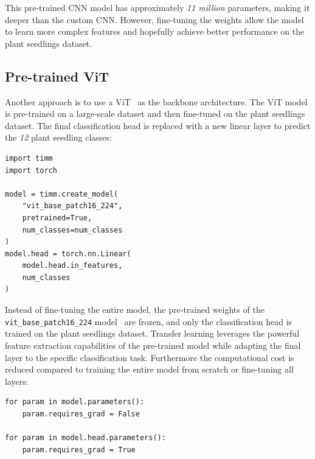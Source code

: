 This pre-trained CNN model has approximately \textit{11 million} parameters, making it deeper than the custom CNN. However, fine-tuning the weights allow the model to learn more complex features and hopefully achieve better performance on the plant seedlings dataset.

\subsection{Pre-trained ViT}

Another approach is to use a ViT~\cite{DBLP:journals/corr/abs-2010-11929} as the backbone architecture. The ViT model is pre-trained on a large-scale dataset and then fine-tuned on the plant seedlings dataset. The final classification head is replaced with a new linear layer to predict the \textit{12} plant seedling classes:

\begin{minipage}{0.9\linewidth}\begin{lstlisting}[caption={Replacing the final classification layer of a pre-trained ViT model.},label={lst:pre-trained-vit}]
import timm
import torch

model = timm.create_model(
    "vit_base_patch16_224",
    pretrained=True,
    num_classes=num_classes
)
model.head = torch.nn.Linear(
    model.head.in_features,
    num_classes
)
\end{lstlisting}\end{minipage}

Instead of fine-tuning the entire model, the pre-trained weights of the \texttt{vit\_base\_patch16\_224} model~\cite{Wightman_PyTorch_Image_Models} are frozen, and only the classification head is trained on the plant seedlings dataset. Transfer learning leverages the powerful feature extraction capabilities of the pre-trained model while adapting the final layer to the specific classification task. Furthermore the computational cost is reduced compared to training the entire model from scratch or fine-tuning all layers:

\begin{minipage}{0.9\linewidth}\begin{lstlisting}[caption={Freezing the pre-trained ViT backbone and training only the classification head.},label={lst:freeze-vit-backbone}]
for param in model.parameters():
    param.requires_grad = False

for param in model.head.parameters():
    param.requires_grad = True
\end{lstlisting}\end{minipage}


